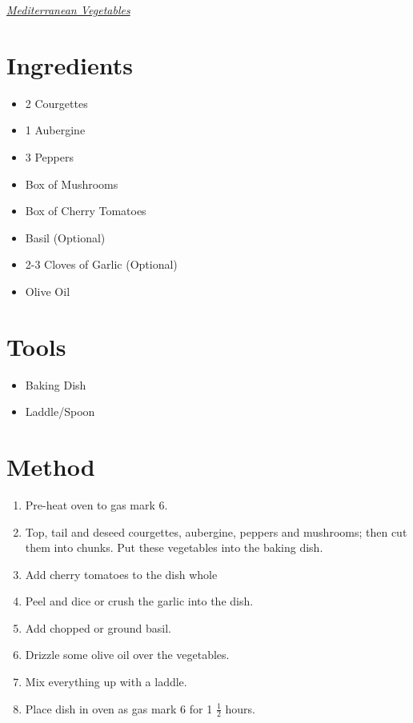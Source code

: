 \documentclass[a4paper,11pt, onecolumn]{article}
\begin{document}
   \centerline{\underline{\emph{\huge Mediterranean Vegetables}}}
   \vspace{1cm}

\begin{multicols}{2}



\section*{Ingredients}

\begin{itemize}
\item 2 Courgettes  
\item 1 Aubergine
\item 3 Peppers
\item Box of Mushrooms
\item Box of Cherry Tomatoes
\item Basil (Optional)
\item 2-3 Cloves of Garlic (Optional)
\item Olive Oil
\end{itemize}

\columnbreak

\section*{Tools}
\begin{itemize}
\item Baking Dish
\item Laddle/Spoon
\end{itemize}

\end{multicols}
\hrulefill
\section*{Method}

\begin{enumerate}
\item Pre-heat oven to gas mark 6.
\item Top, tail and deseed courgettes, aubergine, peppers and mushrooms; then cut them into chunks. 
  Put these vegetables into the baking dish.
\item Add cherry tomatoes to the dish whole
\item Peel and dice or crush the garlic into the dish.
\item Add chopped or ground basil.
\item Drizzle some olive oil over the vegetables.
\item Mix everything up with a laddle.
\item Place dish in oven as gas mark 6 for 1 $\frac{1}{2}$ hours.
\end{enumerate}
 
\end{document}
